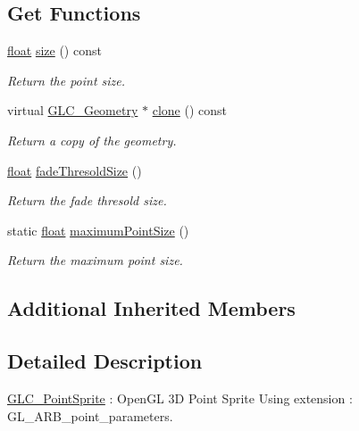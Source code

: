 \subsection*{Get Functions}
\begin{DoxyCompactItemize}
\item 
\hyperlink{_super_l_u_support_8h_a6a1bb6ed41f44b60e7bd83b0e9945aa7}{float} \hyperlink{class_g_l_c___point_sprite_ab57bf677ba914b088c5a7b5ef3579edb}{size} () const 
\begin{DoxyCompactList}\small\item\em Return the point size. \end{DoxyCompactList}\item 
virtual \hyperlink{class_g_l_c___geometry}{G\-L\-C\-\_\-\-Geometry} $\ast$ \hyperlink{class_g_l_c___point_sprite_a1b28dcb9970ed80daddd7ff735de7063}{clone} () const 
\begin{DoxyCompactList}\small\item\em Return a copy of the geometry. \end{DoxyCompactList}\item 
\hyperlink{_super_l_u_support_8h_a6a1bb6ed41f44b60e7bd83b0e9945aa7}{float} \hyperlink{class_g_l_c___point_sprite_a3af64bdbe033346ef3487700b7b8428c}{fade\-Thresold\-Size} ()
\begin{DoxyCompactList}\small\item\em Return the fade thresold size. \end{DoxyCompactList}\item 
static \hyperlink{_super_l_u_support_8h_a6a1bb6ed41f44b60e7bd83b0e9945aa7}{float} \hyperlink{class_g_l_c___point_sprite_af86690312c8be19dc4a1bba59b815f48}{maximum\-Point\-Size} ()
\begin{DoxyCompactList}\small\item\em Return the maximum point size. \end{DoxyCompactList}\end{DoxyCompactItemize}
\subsection*{Additional Inherited Members}


\subsection{Detailed Description}
\hyperlink{class_g_l_c___point_sprite}{G\-L\-C\-\_\-\-Point\-Sprite} \-: Open\-G\-L 3\-D Point Sprite Using extension \-: G\-L\-\_\-\-A\-R\-B\-\_\-point\-\_\-parameters. 

